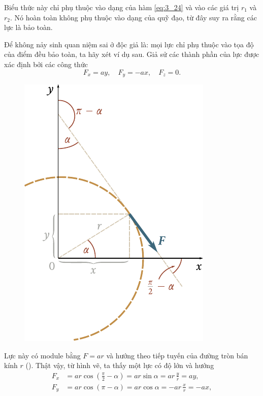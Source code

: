 \noindent
Biểu thức này chỉ phụ thuộc vào dạng của hàm \eqref{eq:3_24} và vào các giá trị $r_1$ và $r_2$. Nó hoàn toàn không phụ thuộc vào dạng của quỹ đạo, từ đây suy ra rằng các lực là bảo toàn. 

Để không nảy sinh quan niệm sai ở độc giả là: mọi lực chỉ phụ thuộc vào tọa độ của điểm đều bảo toàn, ta hãy xét ví dụ sau. Giả sử các thành phần của lực được xác định bởi các công thức
\begin{equation}\label{eq:3_25}
F_x = ay,\quad F_y = -ax,\quad F_z=0.
\end{equation}

\begin{figure}[!htb]
	\begin{center}
		\includegraphics[scale=0.95]{figures/ch_03/fig_3_8.pdf}
		\caption[]{}
		\label{fig:3_8}
	\end{center}
\end{figure}

\noindent
Lực này có module bằng $F=ar$ và hướng theo tiếp tuyến của đường tròn bán kính $r$ (). Thật vậy, từ hình vẽ, ta thấy một lực có độ lớn và hướng 
\begin{align*}
F_x &= ar\cos\left(\frac{\pi}{2}-\alpha\right) = ar\sin\alpha = ar\,\frac{y}{r} = ay,\\
F_y &= ar\cos(\pi-\alpha) = ar\cos\alpha = -ar\,\frac{x}{r} = -ax,
\end{align*}

